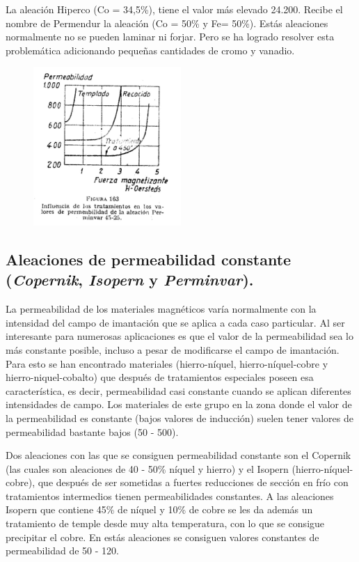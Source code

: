 \documentclass[12pt,a4paper]{article}
\begin{document}
La aleación Hiperco (Co = 34,5\%), tiene el valor más elevado 24.200. Recibe el nombre de Permendur la aleación (Co = 50\% y Fe= 50\%). Estás aleaciones normalmente no se pueden laminar ni forjar. Pero se ha logrado resolver esta problemática adicionando pequeñas cantidades de cromo y vanadio.

\begin{figure}[H]    
    \centering         
    \includegraphics[width=0.5\textwidth]{IMAGENES LATEX/9.jpg}
\end{figure}

\subsection{Aleaciones de permeabilidad constante (\textit{Copernik}, \textit{Isopern} y \textit{Perminvar}).}

La permeabilidad de los materiales magnéticos varía normalmente con la intensidad del campo de imantación que se aplica a cada caso particular. Al ser interesante para numerosas aplicaciones es que el valor de la permeabilidad sea lo más constante posible, incluso a pesar de modificarse el campo de imantación. Para esto se han encontrado materiales (hierro-níquel, hierro-níquel-cobre y hierro-niquel-cobalto) que después de tratamientos especiales poseen esa característica, es decir, permeabilidad casi constante cuando se aplican diferentes intensidades de campo. Los materiales de este grupo en la zona donde el valor de la permeabilidad es constante (bajos valores de inducción) suelen tener valores de permeabilidad bastante bajos (50 - 500).

Dos aleaciones con las que se consiguen permeabilidad constante son el Copernik (las cuales son aleaciones de 40 - 50\% níquel y hierro) y el Isopern (hierro-níquel-cobre), que después de ser sometidas a fuertes reducciones de sección en frío con tratamientos intermedios tienen permeabilidades constantes. A las aleaciones Isopern que contiene 45\% de níquel y 10\% de cobre se les da además un tratamiento de temple desde muy alta temperatura, con lo que se consigue precipitar el cobre. En estás aleaciones se consiguen valores constantes de permeabilidad de 50 - 120.
\end{document}
